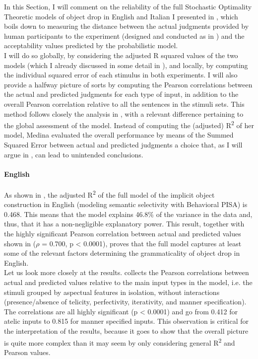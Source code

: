 In this Section, I will comment on the reliability of the full Stochastic Optimality Theoretic models of object drop in English and Italian I presented in , which boils down to measuring the distance between the actual judgments provided by human participants to the experiment (designed and conducted as in ) and the acceptability values predicted by the probabilistic model.\\
I will do so globally, by considering the adjusted R squared values of the two models (which I already discussed in some detail in ), and locally, by computing the individual squared error of each stimulus in both experiments. I will also provide a halfway picture of sorts by computing the Pearson correlations between the actual and predicted judgments for each type of input, in addition to the overall Pearson correlation relative to all the sentences in the stimuli sets. This method follows closely the analysis in \textcite[146-154]{Medina2007}, with a relevant difference pertaining to the global assessment of the model. Instead of computing the (adjusted) R\textsuperscript{2} of her model, Medina evaluated the overall performance by means of the Summed Squared Error between actual and predicted judgments \textemdash a choice that, as I will argue in , can lead to unintended conclusions.


\paragraph{English} 
As shown in , the adjusted R\textsuperscript{2} of the full model of the implicit object construction in English (modeling semantic selectivity with Behavioral PISA) is 0.468. This means that the model explains 46.8\% of the variance in the data and, thus, that it has a non-negligible explanatory power. This result, together with the highly significant Pearson correlation between actual and predicted values shown in  ($\rho$ = 0.700, p < 0.0001), proves that the full model captures at least some of the relevant factors determining the grammaticality of object drop in English.\\
Let us look more closely at the results.  collects the Pearson correlations between actual and predicted values relative to the main input types in the model, i.e. the stimuli grouped by aspectual features in isolation, without interactions (presence/absence of telicity, perfectivity, iterativity, and manner specification). The correlations are all highly significant (p < 0.0001) and go from 0.412 for atelic inputs to 0.815 for manner specified inputs. This observation is critical for the interpretation of the results, because it goes to show that the overall picture is quite more complex than it may seem by only considering general R\textsuperscript{2} and Pearson values.


